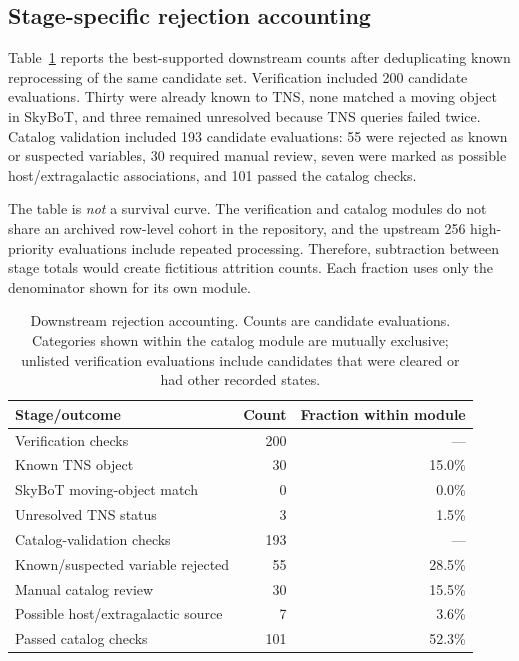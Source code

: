 \documentclass[11pt]{article}
\begin{document}
\subsection{Stage-specific rejection accounting}

Table~\ref{tab:funnel} reports the best-supported downstream counts after deduplicating known reprocessing of the same candidate set. Verification included 200 candidate evaluations. Thirty were already known to TNS, none matched a moving object in SkyBoT, and three remained unresolved because TNS queries failed twice. Catalog validation included 193 candidate evaluations: 55 were rejected as known or suspected variables, 30 required manual review, seven were marked as possible host/extragalactic associations, and 101 passed the catalog checks.

The table is \emph{not} a survival curve. The verification and catalog modules do not share an archived row-level cohort in the repository, and the upstream 256 high-priority evaluations include repeated processing. Therefore, subtraction between stage totals would create fictitious attrition counts. Each fraction uses only the denominator shown for its own module.

\begin{table}[ht]
\centering
\caption{Downstream rejection accounting. Counts are candidate evaluations. Categories shown within the catalog module are mutually exclusive; unlisted verification evaluations include candidates that were cleared or had other recorded states.}
\label{tab:funnel}
\begin{tabular}{lrr}
\toprule
Stage/outcome & Count & Fraction within module \\
\midrule
Verification checks & 200 & --- \\
\quad Known TNS object & 30 & 15.0\% \\
\quad SkyBoT moving-object match & 0 & 0.0\% \\
\quad Unresolved TNS status & 3 & 1.5\% \\
\midrule
Catalog-validation checks & 193 & --- \\
\quad Known/suspected variable rejected & 55 & 28.5\% \\
\quad Manual catalog review & 30 & 15.5\% \\
\quad Possible host/extragalactic source & 7 & 3.6\% \\
\quad Passed catalog checks & 101 & 52.3\% \\
\bottomrule
\end{tabular}
\end{table}
\end{document}
